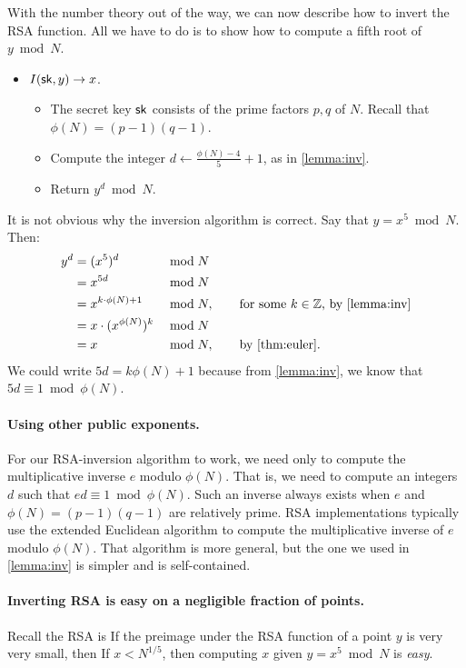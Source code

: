 With the number theory out of the way, we can now describe how
to invert the RSA function.
All we have to do is to show how to compute a fifth root of $y \bmod N$.

\begin{itemize}
  \item $I({\mathsf{sk}}, y) \to x$.
\begin{itemize}
  \item The secret key ${\mathsf{sk}}$ consists of the prime factors $p,q$ of $N$.
        Recall that $\phi(N) = (p-1)(q-1)$.
  \item Compute the integer $d \gets \frac{\phi(N) - 4}{5} + 1$, as in
    \cref{lemma:inv}.

  \item Return $y^d \bmod N$.
\end{itemize}
\end{itemize}

It is not obvious why the inversion algorithm is correct.
Say that $y = x^5 \bmod N$.
Then:
\begin{align*}
  y^d &= (x^5)^d &&\bmod N\\
      &= x^{5d} &&\bmod N\\
&= x^{k \cdot \phi(N) + 1} &&\bmod N, \qquad \text{for some $k \in \Z$, by \cref{lemma:inv}}\\
        &= x \cdot (x^{\phi(N)})^k &&\bmod N\\
&= x &&\bmod N, \qquad\text{by \cref{thm:euler}}.\\
\end{align*}
We could write $5d = k \phi(N) + 1$ because from \cref{lemma:inv},
we know that $5d \equiv 1 \bmod \phi(N)$.

\paragraph{Using other public exponents.}
For our RSA-inversion algorithm to work, we need only to
compute the multiplicative inverse $e$ modulo $\phi(N)$.
That is, we need to compute an integers $d$ such that
$ed \equiv 1 \bmod \phi(N)$.
Such an inverse always exists when $e$ and $\phi(N)=(p-1)(q-1)$ are
relatively prime.
RSA implementations typically use the extended Euclidean
algorithm to compute the multiplicative inverse of $e$ modulo $\phi(N)$.
That algorithm is more general, but the one we used in \cref{lemma:inv}
is simpler and is self-contained.

\paragraph{Inverting RSA is easy on a negligible fraction of points.}
Recall the RSA is 
If the preimage under the RSA function of a point $y$ is very very small,
then 
If $x < N^{1/5}$, then computing $x$ given $y = x^5 \bmod N$ is \emph{easy}.


